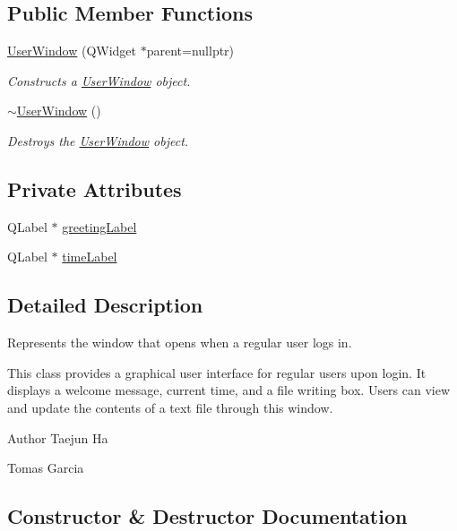 \subsection*{Public Member Functions}
\begin{DoxyCompactItemize}
\item 
\hyperlink{classUserWindow_a87837d38f7a4cdd10bf4edff99ac4254}{User\+Window} (Q\+Widget $\ast$parent=nullptr)
\begin{DoxyCompactList}\small\item\em Constructs a \hyperlink{classUserWindow}{User\+Window} object. \end{DoxyCompactList}\item 
\hyperlink{classUserWindow_a1b19d1374d05728798f90762b7ec5ff1}{$\sim$\+User\+Window} ()
\begin{DoxyCompactList}\small\item\em Destroys the \hyperlink{classUserWindow}{User\+Window} object. \end{DoxyCompactList}\end{DoxyCompactItemize}
\subsection*{Private Attributes}
\begin{DoxyCompactItemize}
\item 
Q\+Label $\ast$ \hyperlink{classUserWindow_a46f41fd1a46d9159b326c1780a00ee70}{greeting\+Label}
\item 
Q\+Label $\ast$ \hyperlink{classUserWindow_a8e334a68ebdb3dd0cdd449dbcf2e5ece}{time\+Label}
\end{DoxyCompactItemize}


\subsection{Detailed Description}
Represents the window that opens when a regular user logs in. 

This class provides a graphical user interface for regular users upon login. It displays a welcome message, current time, and a file writing box. Users can view and update the contents of a text file through this window.

\begin{DoxyAuthor}{Author}
Taejun Ha 

Tomas Garcia 
\end{DoxyAuthor}


\subsection{Constructor \& Destructor Documentation}
\mbox{\label{classUserWindow_a87837d38f7a4cdd10bf4edff99ac4254}} 
